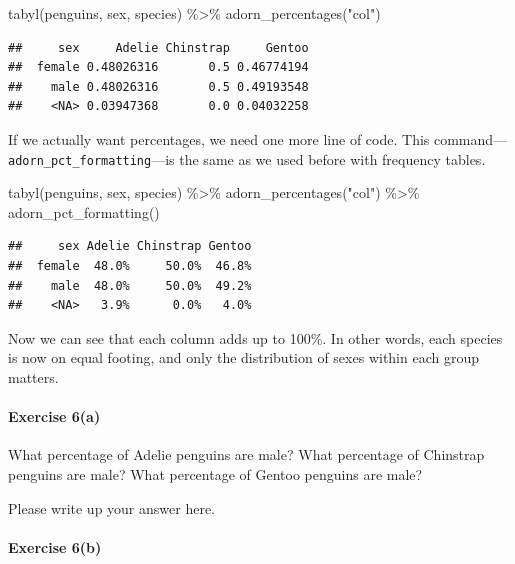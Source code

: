 \documentclass[
]{book}
\newenvironment{Shaded}{\begin{snugshade}}{\end{snugshade}}
\newcommand{\FunctionTok}[1]{\textcolor[rgb]{0.00,0.00,0.00}{#1}}
\newcommand{\NormalTok}[1]{#1}
\newcommand{\SpecialCharTok}[1]{\textcolor[rgb]{0.00,0.00,0.00}{#1}}
\newcommand{\StringTok}[1]{\textcolor[rgb]{0.31,0.60,0.02}{#1}}
\begin{document}
\begin{Shaded}
\begin{Highlighting}[]
\FunctionTok{tabyl}\NormalTok{(penguins, sex, species) }\SpecialCharTok{\%\textgreater{}\%}
    \FunctionTok{adorn\_percentages}\NormalTok{(}\StringTok{"col"}\NormalTok{)}
\end{Highlighting}
\end{Shaded}

\begin{verbatim}
##     sex     Adelie Chinstrap     Gentoo
##  female 0.48026316       0.5 0.46774194
##    male 0.48026316       0.5 0.49193548
##    <NA> 0.03947368       0.0 0.04032258
\end{verbatim}

If we actually want percentages, we need one more line of code. This command---\texttt{adorn\_pct\_formatting}---is the same as we used before with frequency tables.

\begin{Shaded}
\begin{Highlighting}[]
\FunctionTok{tabyl}\NormalTok{(penguins, sex, species) }\SpecialCharTok{\%\textgreater{}\%}
    \FunctionTok{adorn\_percentages}\NormalTok{(}\StringTok{"col"}\NormalTok{) }\SpecialCharTok{\%\textgreater{}\%}
    \FunctionTok{adorn\_pct\_formatting}\NormalTok{()}
\end{Highlighting}
\end{Shaded}

\begin{verbatim}
##     sex Adelie Chinstrap Gentoo
##  female  48.0%     50.0%  46.8%
##    male  48.0%     50.0%  49.2%
##    <NA>   3.9%      0.0%   4.0%
\end{verbatim}

Now we can see that each column adds up to 100\%. In other words, each species is now on equal footing, and only the distribution of sexes within each group matters.

\hypertarget{exercise-6a}{%
\paragraph*{Exercise 6(a)}\label{exercise-6a}}

What percentage of Adelie penguins are male? What percentage of Chinstrap penguins are male? What percentage of Gentoo penguins are male?

Please write up your answer here.

\hypertarget{exercise-6b}{%
\paragraph*{Exercise 6(b)}\label{exercise-6b}}
\end{document}
